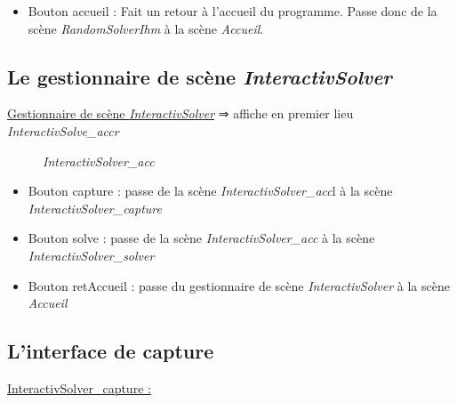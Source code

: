 \begin{itemize}
	\item Bouton accueil : Fait un retour à l'accueil du programme. Passe donc de la scène \textit{RandomSolverIhm} à la scène \textit{Accueil}.
\end{itemize}

\subsection{Le gestionnaire de scène \textit{InteractivSolver}}
\underline{Gestionnaire de scène \textit{InteractivSolver}}
⇒ affiche en premier lieu \textit{InteractivSolve\_accr}

\begin{figure}[H]
\begin{center}
\end{center}
	\caption{ \textit{InteractivSolver\_acc}}
\end{figure}

\begin{itemize}
    \item Bouton capture : passe de la scène \textit{InteractivSolver\_acc}l à la scène \textit{InteractivSolver\_capture}
    \item Bouton solve : passe de la scène \textit{InteractivSolver\_acc} à la scène \textit{InteractivSolver\_solver}
    \item Bouton retAccueil : passe du gestionnaire de scène \textit{InteractivSolver} à la scène \textit{Accueil}
\end{itemize}

\subsection{L'interface de capture}
\underline{InteractivSolver\_capture :}

